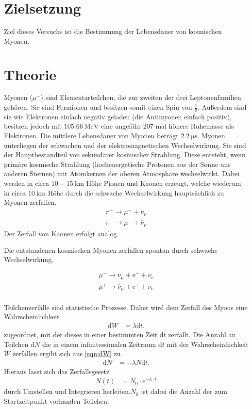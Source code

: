 \section{Zielsetzung}
\label{sec:Zielsetzung}
Ziel dieses Versuchs ist die Bestimmung der Lebensdauer von kosmischen Myonen.


\section{Theorie}
\label{sec:Theorie}

Myonen ($\mu^-$) sind Elementarteilchen, die zur zweiten der drei Leptonenfamilien gehören.
Sie sind Fermionen und besitzen somit einen Spin von $\frac{1}{2}$.
Außerdem sind sie wie Elektronen einfach negativ geladen (die Antimyonen einfach positiv), besitzen jedoch mit $\qty{105.66}{\mega\electronvolt}$
eine ungefähr 207-mal höhere Ruhemasse als Elektronen.
Die mittlere Lebensdauer von Myonen beträgt $\qty{2.2}{\micro\second}$. \cite{PDG}
Myonen unterliegen der schwachen und der elektromagnetischen Wechselwirkung.
Sie sind der Hauptbestandteil von sekundärer kosmischer Strahlung.
Diese entsteht, wenn primäre kosmische Strahlung (hochenergetische Protonen aus der Sonne uns anderen Sternen) mit Atomkernen
der oberen Atmosphäre wechselwirkt. Dabei werden in circa $10-\qty{15}{\kilo\meter}$ Höhe Pionen und Kaonen erzeugt,
welche wiederum in circa $\qty{10}{\kilo\meter}$ Höhe durch die schwache Wechselwirkung hauptsächlich zu Myonen zerfallen.
\begin{align*}
    \pi^+ \longrightarrow \mu^+ + \nu_{\mu} \\
    \pi^- \longrightarrow \mu^- + \overline{\nu}_{\mu}
\end{align*}
Der Zerfall von Kaonen erfolgt analog.

Die entstandenen kosmischen Myonen zerfallen spontan durch schwache Wechselwirkung.

\begin{align*}
    \mu^- \longrightarrow \nu_{\mu} + \text{e}^- + \overline{\nu}_{\text{e}} \\
    \mu^+ \longrightarrow \overline{\nu}_{\mu} + \text{e}^+ + \nu_{\text{e}} 
\end{align*}
\\

Teilchenzerfälle sind statistische Prozesse. Daher wird dem Zerfall des Myons
eine Wahrscheinlichkeit 
\begin{align}
    \text{d}W &= \lambda \text{d}t.
    \label{eqn:dW}
\end{align}
zugeordnet, mit der dieses in einer bestimmten Zeit $\text{d}t$ zerfällt.
Die Anzahl an Teilchen $\text{d}N$ die in einem infinitessimalen Zeitraum $\text{d}t$ mit der Wahrscheinliichkeit $W$ zerfallen ergibt sich
aus \eqref{eqn:dW} zu 
\begin{align*}
    \text{d}N &= -\lambda N\text{d}t.
\end{align*}
Hieraus lässt sich das Zerfallsgesetz 
\begin{align}
    N(t) &= N_0 \cdot e^{- \lambda \cdot t}\label{eqn:Zerfallsgesetz}
\end{align}
durch Umstellen und Integrieren herleiten.$N_0$ ist dabei die Anzahl der zum Startzeitpunkt vorhanden Teilchen. 

